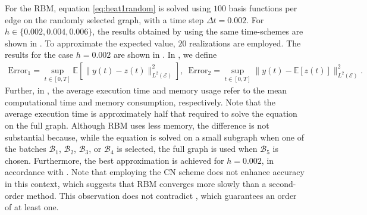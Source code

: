 \documentclass[a4paper, 10pt, english]{article}
\begin{document}
For the RBM, equation \eqref{eq:heat1random} is solved using $100$ basis functions per edge on the randomly selected graph, with a time step $\Delta t = 0.002$. For $h\in\{0.002,0.004,0.006\}$, the results obtained by using the same time-schemes are shown in . To approximate the expected value, $20$ realizations are employed. The results for the case $h=0.002$ are shown in . In , we define
\begin{align}\label{eq:definition_error}
    \text{Error}_1 = \sup_{t\in [0,T]} \mathbb{E}\left[\|y(t)-z(t)\|^2_{L^2(\mathcal{E})}\right],\,\,\, \text{Error}_2 = \sup_{t\in [0,T]} \|y(t)-\mathbb{E}\left[z(t)\right]\|^2_{L^2(\mathcal{E})}.
\end{align}
Further, in , the average execution time and memory usage refer to the mean computational time and memory consumption, respectively. Note that the average execution time is approximately half that required to solve the equation on the full graph. Although RBM uses less memory, the difference is not substantial because, while the equation is solved on a small subgraph when one of the batches $\mathcal{B}_1$, $\mathcal{B}_2$, $\mathcal{B}_3$, or $\mathcal{B}_4$ is selected, the full graph is used when $\mathcal{B}_5$ is chosen. Furthermore, the best approximation is achieved for $h=0.002$, in accordance with . Note that employing the CN scheme does not enhance accuracy in this context, which suggests that RBM converges more slowly than a second-order method. This observation does not contradict , which guarantees an order of at least one.
\end{document}
